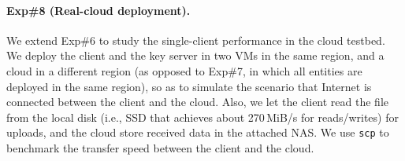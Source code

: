 \paragraph{Exp\#8 (Real-cloud deployment).}
We extend Exp\#6 to study the single-client performance in the cloud testbed. We deploy the client and the key server in two VMs in the same region, and a cloud in a different region (as opposed to Exp\#7, in which all entities are deployed in the same region), so as to simulate the scenario that Internet is connected between  the client and the cloud. Also, we let the client read the file from the local disk (i.e., SSD that achieves about 270\,MiB/s for reads/writes) for uploads, and the cloud store received data in the attached NAS. We use {\tt scp} to benchmark the transfer speed between the client and the cloud.






